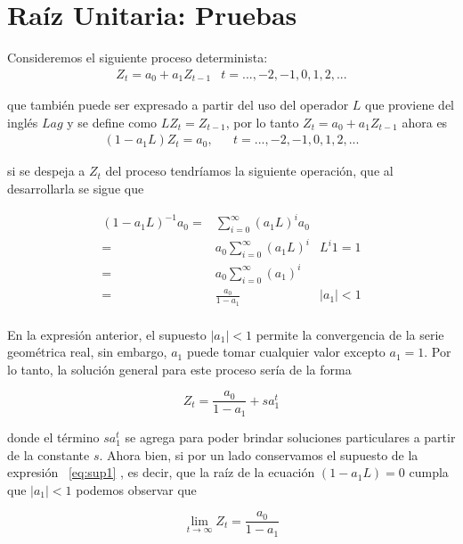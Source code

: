 \section{Raíz Unitaria: Pruebas} \label{pruebas_orden_integracion}

Consideremos el siguiente proceso determinista:
\begin{eqnarray}
Z_t = a_0+a_1 Z_{t-1} &  t=...,-2,-1,0,1,2,...
\end{eqnarray}

que también puede ser expresado a partir del uso del operador $L $ que proviene del inglés $Lag$ y se define como $LZ_t=Z_{t-1}$, por lo tanto $ Z_t = a_0+a_1 Z_{t-1}$ ahora es
\begin{eqnarray}
(1-a_1L)Z_t = a_0,  & &  t=...,-2,-1,0,1,2,...
\end{eqnarray}

si se despeja a $Z_t$ del proceso tendríamos la siguiente operación, que al desarrollarla se sigue que 

\begin{eqnarray} \label{eq:sup1} 
 (1-a_1L)^{-1} a_0 =&  \sum_{i=0}^{\infty} (a_1L)^{i}a_0  &  \nonumber  \\ 
        = & a_0\sum_{i=0}^{\infty} (a_1L)^{i} & L^i 1=1  \nonumber \\
         = & a_0\sum_{i=0}^{\infty} (a_1)^{i} &  \\
         = & \frac{a_0}{1-a_1} & \left | a_1 \right |<1  \nonumber \\
 & &  \nonumber
\end{eqnarray}


En la expresión anterior, el supuesto $\left | a_1 \right |<1$ permite la convergencia de la serie geométrica real, sin embargo, $a_1$  puede tomar cualquier valor excepto $a_1=1$.   Por lo tanto, la solución general para este proceso sería de la forma 

\begin{equation}
Z_t=\frac{a_0}{1-a_1} + sa_1^t
\end{equation} 

donde  el t\'ermino $sa_1^t$ se agrega para poder brindar soluciones particulares a partir de la constante $s$. Ahora bien, si por un lado conservamos el supuesto de la expresión ~\ref{eq:sup1} , es decir, que la raíz de la ecuación $(1-a_1L)=0$ cumpla que $\left | a_1 \right |<1$  podemos observar que

\begin{equation}
\lim_{t\rightarrow \infty } Z_t=\frac{a_0}{1-a_1}
\end{equation}   

